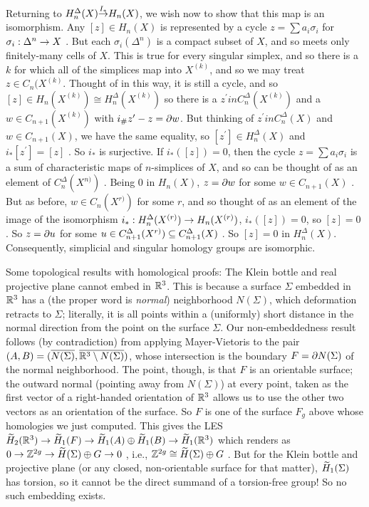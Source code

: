 Returning to $H_n^\Delta(X) {\buildrel {I_*}\over \ra} H_n(X)$, we wish now to show that this map is an isomorphism.
Any $[z]\in H_n(X)$ is represented by a cycle $z=\sum a_i\sigma_i$ for $\sigma_i:\Delta^n\rightarrow X$ . But each
$\sigma_i(\Delta^n)$ is a compact subset of $X$, and so meets only finitely-many cells of $X$. This is true for every
singular simplex, and so there is a $k$ for which all of the simplices map into $X^{(k)}$, and so we may
treat $z\in C_n(X^{(k)}$. Thought of in this way, it is still a cycle, and so $[z]\in H_n(X^{(k)})\cong H_n^\Delta(X^{(k)})$
so there is a $z^\prime in C_n^\Delta(X^{(k)})$ and a $w\in C_{n+1}(X^{(k)})$ with $i_\#z^\prime -z=\partial w$. 
But thinking of  $z^\prime in C_n^\Delta(X)$ and $w\in C_{n+1}(X)$, we have the same equality, so 
$[z^\prime] \in H_n^\Delta(X)$ and $i_*[z^\prime] = [z]$ . So $i_*$ is surjective.
If $i_*([z]) = 0$, then the cycle $z=\sum a_i\sigma_i$ is a sum of characteristic maps of $n$-simplices of $X$, and
so can be thought of as an element of $C_n^\Delta(X^{n)})$ . Being $0$ in $H_n(X)$, $z=\partial w$ for some
$w\in C_{n+1}(X)$ . But as before, $w\in C_n(X^{r)})$ for some $r$, and so thought of as an element of 
the image of the isomorphism $i_*: H_n^\Delta(X^{(r)})\rightarrow H_n(X^{(r)})$, $i_*([z])=0$, so $[z]=0$ . So 
$z=\partial u$ for some $u\in C_{n+1}^\Delta(X^{r)})\subseteq C_{n+1}^\Delta(X)$ . So $[z]=0$ in $H_n^\Delta(X)$.
Consequently, simplicial and singular homology groups are isomorphic.




\bigskip

Some topological results with homological proofs: The Klein bottle and real projective plane cannot 
embed in ${\Bbb R}^3$. This is because a surface $\Sigma$ embedded in ${\Bbb R}^3$ has a (the proper word is {\it normal})
neighborhood $N(\Sigma)$, which deformation retracts to $\Sigma$; literally, it is all points within a (uniformly) short distance
in the normal direction from the point on the surface $\Sigma$. Our non-embeddedness result follows (by contradiction)
from applying Mayer-Vietoris to the pair $(A,B) = (\overline{N(\Sigma)},\overline{{\Bbb R}^3\setminus N(\Sigma)})$, whose intersection
is the boundary $F=\partial N(\Sigma)$ of the normal neighborhood. The point, though, is that
$F$ is an orientable surface; the outward normal (pointing away from $N(\Sigma)$) at every point, taken as
the first vector of a right-handed orientation of ${\Bbb R}^3$ allows us to use the other two vectors as an 
orientation of the surface. So $F$ is one of the surface $F_g$ above whose homologies we just computed.
This gives the LES
\hhsk
$\widetilde{H}_2({\Bbb R}^3) \rightarrow \widetilde{H}_1(F) \rightarrow \widetilde{H}_1(A)\oplus \widetilde{H}_1(B)\rightarrow \widetilde{H}_1({\Bbb R} ^3)$
\hhsk 
which renders as 
\hhsk
$0\rightarrow{\Bbb Z}^{2g}\rightarrow \widetilde{H}(\Sigma)\oplus G\rightarrow 0$
\hhsk , i.e., \hhsk
${\Bbb Z}^{2g}\cong \widetilde{H}(\Sigma)\oplus G$ 
\hhsk . But for the Klein bottle and projective plane (or any closed, non-orientable
surface for that matter), $\widetilde{H}_1(\Sigma)$ has torsion, so it cannot be the direct
summand of a torsion-free group! So no such embedding exists.

